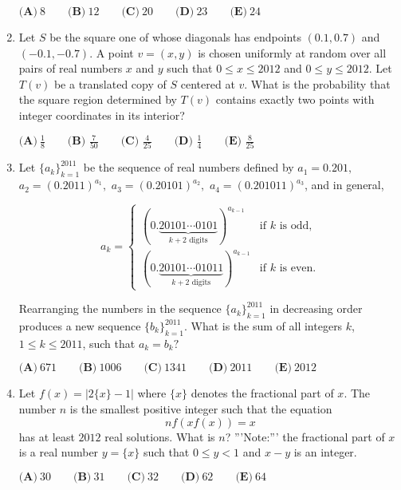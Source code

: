 \documentclass{article}
\begin{document}
\begin{enumerate}[label=\arabic*., itemsep=0.5em]
\( \textbf{(A)}\ 8\qquad\textbf{(B)}\ 12\qquad\textbf{(C)}\ 20\qquad\textbf{(D)}\ 23\qquad\textbf{(E)}\ 24 \)\par \vspace{0.5em}\item Let \(S\) be the square one of whose diagonals has endpoints \((0.1,0.7)\) and \((-0.1,-0.7)\).  A point \(v=(x,y)\) is chosen uniformly at random over all pairs of real numbers \(x\) and \(y\) such that \(0 \le x \le 2012\) and \(0\le y\le 2012\).  Let \(T(v)\) be a translated copy of \(S\) centered at \(v\).  What is the probability that the square region determined by \(T(v)\) contains exactly two points with integer coordinates in its interior?

\( \textbf{(A)}\ \frac{1}{8}\qquad\textbf{(B) }\frac{7}{50}\qquad\textbf{(C) }\frac{4}{25}\qquad\textbf{(D) }\frac{1}{4}\qquad\textbf{(E) }\frac{8}{25} \)\par \vspace{0.5em}\item Let \(\{a_k\}_{k=1}^{2011}\) be the sequence of real numbers defined by \(a_1=0.201,\) \(a_2=(0.2011)^{a_1},\) \(a_3=(0.20101)^{a_2},\) \(a_4=(0.201011)^{a_3}\), and in general, 


\begin{equation*}
a_k=\begin{cases}
(0.\underbrace{20101\cdots 0101}_{k+2\text{ digits}})^{a_{k-1}} & \text{if }k\text{ is odd,}\\
(0.\underbrace{20101\cdots 01011}_{k+2\text{ digits}})^{a_{k-1}}& \text{if }k\text{ is even.}
\end{cases}
\end{equation*}


Rearranging the numbers in the sequence  \(\{a_k\}_{k=1}^{2011}\) in decreasing order produces a new sequence  \(\{b_k\}_{k=1}^{2011}\).  What is the sum of all integers \(k\), \(1\le k \le 2011\), such that \(a_k=b_k?\)

\( \textbf{(A)}\ 671\qquad\textbf{(B)}\ 1006\qquad\textbf{(C)}\ 1341\qquad\textbf{(D)}\ 2011\qquad\textbf{(E)}\ 2012 \)\par \vspace{0.5em}\item Let \(f(x)=|2\{x\}-1|\) where \(\{x\}\) denotes the fractional part of \(x\).  The number \(n\) is the smallest positive integer such that the equation 
\begin{equation*}
nf(xf(x))=x
\end{equation*}
 has at least \(2012\) real solutions.  What is \(n\)?  '''Note:''' the fractional part of \(x\) is a real number \(y=\{x\}\) such that \(0\le y<1\) and \(x-y\) is an integer.

\( \textbf{(A)}\ 30\qquad\textbf{(B)}\ 31\qquad\textbf{(C)}\ 32\qquad\textbf{(D)}\ 62\qquad\textbf{(E)}\ 64 \)\par \vspace{0.5em}\end{enumerate}
\end{document}
